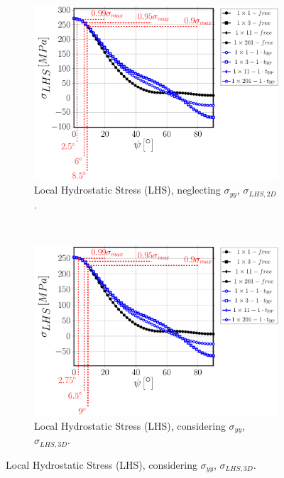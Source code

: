 \begin{figure}[!hp]
    \begin{subfigure}[b]{0.475\textwidth}
        \includegraphics[width=\textwidth]{paperE/vf60-nodamage-p2D.pdf}
        \caption{Local Hydrostatic Stress (LHS), neglecting $\sigma_{yy}$, $\sigma_{LHS,2D}$.}\label{paperE:fig:stress-c}
    \end{subfigure} ~
    \begin{subfigure}[b]{0.475\textwidth}
        \includegraphics[width=\textwidth]{paperE/vf60-nodamage-p3D.pdf}
        \caption{Local Hydrostatic Stress (LHS), considering $\sigma_{yy}$, $\sigma_{LHS,3D}$.}\label{paperE:fig:stress-d}
    \end{subfigure}


\end{figure}
